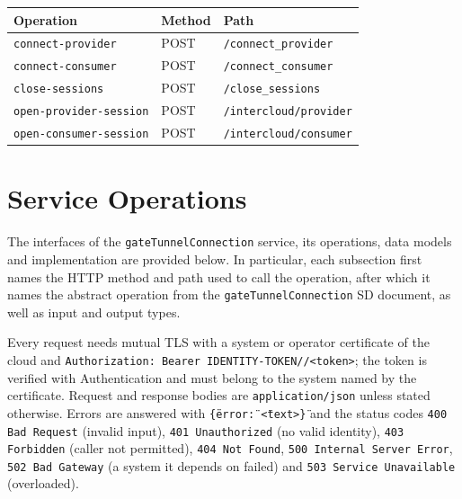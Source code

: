 \documentclass[a4paper]{arrowhead}
\begin{document}
\noindent\begin{longtable}{| p{5.2cm} | p{1.6cm} | p{8.4cm} |} \hline
\rowcolor{gray!33} Operation & Method & Path \\ \hline \endhead
\texttt{connect-\allowbreak{}provider} & POST & \texttt{/\allowbreak{}connect\_\allowbreak{}provider} \\ \hline
\texttt{connect-\allowbreak{}consumer} & POST & \texttt{/\allowbreak{}connect\_\allowbreak{}consumer} \\ \hline
\texttt{close-\allowbreak{}sessions} & POST & \texttt{/\allowbreak{}close\_\allowbreak{}sessions} \\ \hline
\texttt{open-\allowbreak{}provider-\allowbreak{}session} & POST & \texttt{/\allowbreak{}intercloud/\allowbreak{}provider} \\ \hline
\texttt{open-\allowbreak{}consumer-\allowbreak{}session} & POST & \texttt{/\allowbreak{}intercloud/\allowbreak{}consumer} \\ \hline
\end{longtable}

\newpage

\section{Service Operations}
\label{sec:operations}

The interfaces of the \texttt{gate\allowbreak{}Tunnel\allowbreak{}Connection} service, its operations, data models and implementation are provided below.
In particular, each subsection first names the HTTP method and path used to call the operation, after which it names the abstract operation from the \texttt{gate\allowbreak{}Tunnel\allowbreak{}Connection} SD document, as well as input and output types.

Every request needs mutual TLS with a system or operator certificate of the cloud and \texttt{Authorization: Bearer IDENTITY-TOKEN//<token>}; the token is verified with Authentication and must belong to the system named by the certificate. Request and response bodies are \texttt{application/json} unless stated otherwise.
Errors are answered with \texttt{\{\"error\": \"<text>\"\}} and the status codes \texttt{400 Bad Request} (invalid input), \texttt{401 Unauthorized} (no valid identity), \texttt{403 Forbidden} (caller not permitted), \texttt{404 Not Found}, \texttt{500 Internal Server Error}, \texttt{502 Bad Gateway} (a system it depends on failed) and \texttt{503 Service Unavailable} (overloaded).
\end{document}
